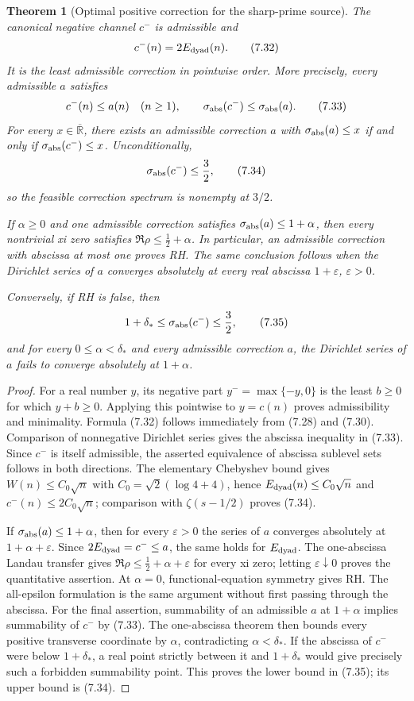 \documentclass[11pt]{article}
\newtheorem{theorem}{Theorem}[section]
\newcommand{\R}{\mathbb R}
\begin{document}
\begin{theorem}[Optimal positive correction for the sharp-prime source]
\label{thm:minimal-sharp-correction}
The canonical negative channel $c^-$ is admissible and
\[
 c^-(n)=2E_{\rm dyad}(n).
 \tag{7.32}
\]
It is the least admissible correction in pointwise order.  More precisely, every admissible
$a$ satisfies
\[
 c^-(n)\le a(n)\quad(n\ge1),
 \qquad
 \sigma_{\rm abs}(c^-)\le\sigma_{\rm abs}(a).
 \tag{7.33}
\]
For every $x\in\overline{\R}$, there exists an admissible correction $a$ with
$\sigma_{\rm abs}(a)\le x$ if and only if $\sigma_{\rm abs}(c^-)\le x$.
Unconditionally,
\[
 \sigma_{\rm abs}(c^-)\le\frac32,
 \tag{7.34}
\]
so the feasible correction spectrum is nonempty at $3/2$.

If $\alpha\ge0$ and one admissible correction satisfies
$\sigma_{\rm abs}(a)\le1+\alpha$, then every nontrivial xi zero satisfies
$\Re\rho\le\frac12+\alpha$.  In particular, an admissible correction with abscissa at most one
proves RH.  The same conclusion follows when the Dirichlet series of $a$ converges absolutely at
every real abscissa $1+\varepsilon$, $\varepsilon>0$.

Conversely, if RH is false, then
\[
 1+\delta_*\le\sigma_{\rm abs}(c^-)\le\frac32,
 \tag{7.35}
\]
and for every $0\le\alpha<\delta_*$ and every admissible correction $a$, the Dirichlet series of
$a$ fails to converge absolutely at $1+\alpha$.
\end{theorem}

\begin{proof}
For a real number $y$, its negative part $y^-=\max\{-y,0\}$ is the least $b\ge0$ for which
$y+b\ge0$.  Applying this pointwise to $y=c(n)$ proves admissibility and minimality.  Formula
\textup{(7.32)} follows immediately from \textup{(7.28)} and \textup{(7.30)}.  Comparison of
nonnegative Dirichlet series gives the abscissa inequality in \textup{(7.33)}.  Since $c^-$ is
itself admissible, the asserted equivalence of abscissa sublevel sets follows in both directions.
The elementary Chebyshev bound gives
$W(n)\le C_0\sqrt n$ with $C_0=\sqrt2(\log4+4)$, hence
$E_{\rm dyad}(n)\le C_0\sqrt n$ and $c^-(n)\le2C_0\sqrt n$; comparison with
$\zeta(s-1/2)$ proves \textup{(7.34)}.

If $\sigma_{\rm abs}(a)\le1+\alpha$, then for every $\varepsilon>0$ the series of $a$ converges
absolutely at $1+\alpha+\varepsilon$.  Since $2E_{\rm dyad}=c^-\le a$, the same holds for
$E_{\rm dyad}$.
The one-abscissa Landau transfer gives
$\Re\rho\le\frac12+\alpha+\varepsilon$ for every xi zero; letting
$\varepsilon\downarrow0$ proves the quantitative assertion.  At $\alpha=0$, functional-equation
symmetry gives RH.  The all-epsilon formulation is the same argument without first passing
through the abscissa.  For the final assertion, summability of an admissible $a$ at
$1+\alpha$ implies summability of $c^-$ by \textup{(7.33)}.  The one-abscissa theorem then bounds
every positive transverse coordinate by $\alpha$, contradicting
$\alpha<\delta_*$.  If the abscissa of $c^-$ were below $1+\delta_*$, a real point strictly
between it and $1+\delta_*$ would give precisely such a forbidden summability point.  This proves
the lower bound in \textup{(7.35)}; its upper bound is \textup{(7.34)}.
\end{proof}
\end{document}
